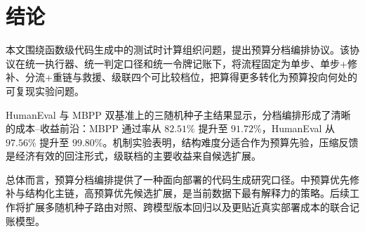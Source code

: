 \section{结论}
\label{sec:conclusion}

本文围绕函数级代码生成中的测试时计算组织问题，提出预算分档编排协议。该协议在统一执行器、统一判定口径和统一令牌记账下，将流程固定为单步、单步+修补、分流+重链与救援、级联四个可比较档位，把算得更多转化为预算投向何处的可复现实验问题。

HumanEval 与 MBPP 双基准上的三随机种子主结果显示，分档编排形成了清晰的成本--收益前沿：MBPP 通过率从 $82.51\%$ 提升至 $91.72\%$，HumanEval 从 $97.56\%$ 提升至 $99.80\%$。机制实验表明，结构难度分适合作为预算先验，压缩反馈是经济有效的回注形式，级联档的主要收益来自候选扩展。

总体而言，预算分档编排提供了一种面向部署的代码生成研究口径。中预算优先修补与结构化主链，高预算优先候选扩展，是当前数据下最有解释力的策略。后续工作将扩展多随机种子路由对照、跨模型版本回归以及更贴近真实部署成本的联合记账模型。
